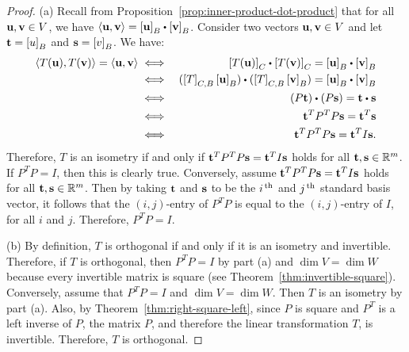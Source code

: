\begin{proof}
  (a) Recall from Proposition~\ref{prop:inner-product-dot-product}
  that for all $\vect{u},\vect{v}\in V$, we have
  $\iprod{\vect{u},\vect{v}} = \coord{\vect{u}}_B\dotprod
  \coord{\vect{v}}_B$. Consider two vectors $\vect{u},\vect{v}\in V$
  and let $\vect{t}=\coord{u}_B$ and $\vect{s}=\coord{v}_B$. We have:
  \begin{eqnarray*}
    \iprod{T(\vect{u}),T(\vect{v})} = \iprod{\vect{u},\vect{v}}
    &\iff& \coord{T(\vect{u})}_C\dotprod \coord{T(\vect{v})}_C
           = \coord{\vect{u}}_B\dotprod \coord{\vect{v}}_B \\
    &\iff& (\coord{T}_{C,B}\coord{\vect{u}}_B)\dotprod (\coord{T}_{C,B}\coord{\vect{v}}_B)
           = \coord{\vect{u}}_B\dotprod \coord{\vect{v}}_B \\
    &\iff& (P\vect{t})\dotprod (P\vect{s})
           = \vect{t}\dotprod \vect{s} \\
    &\iff& \vect{t}^T P^T P\vect{s}
           = \vect{t}^T \vect{s} \\
    &\iff& \vect{t}^T P^T P\vect{s}
           = \vect{t}^T I \vect{s}.
  \end{eqnarray*}
  Therefore, $T$ is an isometry if and only if
  $\vect{t}^T P^T P\vect{s} = \vect{t}^T I \vect{s}$ holds for all
  $\vect{t},\vect{s}\in\R^m$. If $P^TP=I$, then this is clearly
  true. Conversely, assume
  $\vect{t}^T P^T P\vect{s} = \vect{t}^T I \vect{s}$ holds for all
  $\vect{t},\vect{s}\in\R^m$. Then by taking $\vect{t}$ and $\vect{s}$
  to be the $i^{\,\rm th}$ and $j^{\,\rm th}$ standard basis vector, it follows that
  the $(i,j)$-entry of $P^TP$ is equal to the $(i,j)$-entry of $I$,
  for all $i$ and $j$. Therefore, $P^TP=I$.

  (b) By definition, $T$ is orthogonal if and only if it is an
  isometry and invertible. Therefore, if $T$ is orthogonal, then
  $P^TP=I$ by part (a) and $\dim V=\dim W$ because every invertible
  matrix is square (see
  Theorem~\ref{thm:invertible-square}). Conversely, assume that
  $P^TP=I$ and $\dim V=\dim W$. Then $T$ is an isometry by part
  (a). Also, by Theorem~\ref{thm:right-square-left}, since $P$ is
  square and $P^T$ is a left inverse of $P$, the matrix $P$, and
  therefore the linear transformation $T$, is invertible. Therefore,
  $T$ is orthogonal.
\end{proof}


